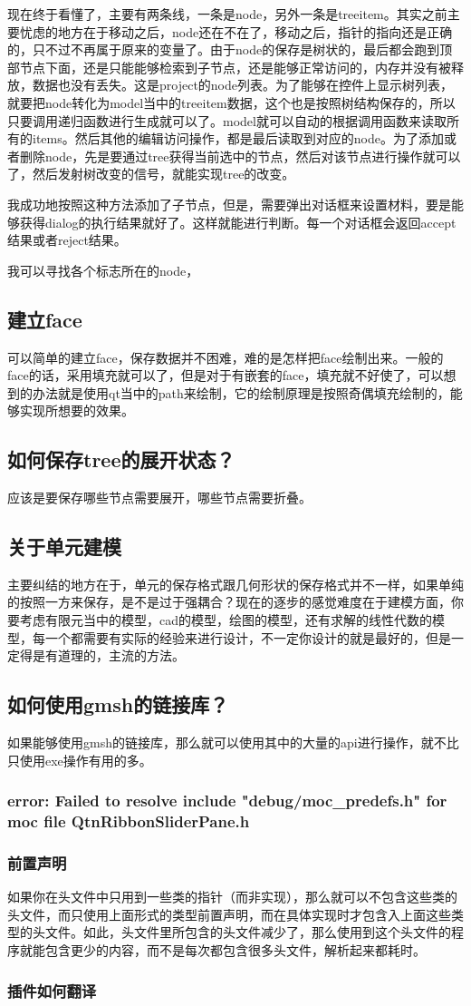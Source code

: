 现在终于看懂了，主要有两条线，一条是node，另外一条是treeitem。其实之前主要忧虑的地方在于移动之后，node还在不在了，移动之后，指针的指向还是正确的，只不过不再属于原来的变量了。由于node的保存是树状的，最后都会跑到顶部节点下面，还是只能能够检索到子节点，还是能够正常访问的，内存并没有被释放，数据也没有丢失。这是project的node列表。为了能够在控件上显示树列表，就要把node转化为model当中的treeitem数据，这个也是按照树结构保存的，所以只要调用递归函数进行生成就可以了。model就可以自动的根据调用函数来读取所有的items。然后其他的编辑访问操作，都是最后读取到对应的node。为了添加或者删除node，先是要通过tree获得当前选中的节点，然后对该节点进行操作就可以了，然后发射树改变的信号，就能实现tree的改变。

我成功地按照这种方法添加了子节点，但是，需要弹出对话框来设置材料，要是能够获得dialog的执行结果就好了。这样就能进行判断。每一个对话框会返回accept结果或者reject结果。

我可以寻找各个标志所在的node，
\subsection{建立face}
可以简单的建立face，保存数据并不困难，难的是怎样把face绘制出来。一般的face的话，采用填充就可以了，但是对于有嵌套的face，填充就不好使了，可以想到的办法就是使用qt当中的path来绘制，它的绘制原理是按照奇偶填充绘制的，能够实现所想要的效果。
\subsection{如何保存tree的展开状态？}
应该是要保存哪些节点需要展开，哪些节点需要折叠。
\subsection{关于单元建模}
主要纠结的地方在于，单元的保存格式跟几何形状的保存格式并不一样，如果单纯的按照一方来保存，是不是过于强耦合？现在的逐步的感觉难度在于建模方面，你要考虑有限元当中的模型，cad的模型，绘图的模型，还有求解的线性代数的模型，每一个都需要有实际的经验来进行设计，不一定你设计的就是最好的，但是一定得是有道理的，主流的方法。
\subsection{如何使用gmsh的链接库？}
如果能够使用gmsh的链接库，那么就可以使用其中的大量的api进行操作，就不比只使用exe操作有用的多。
\subsubsection{error: Failed to resolve include "debug/moc\_predefs.h" for moc file QtnRibbonSliderPane.h}
\subsubsection{前置声明}
如果你在头文件中只用到一些类的指针（而非实现），那么就可以不包含这些类的头文件，而只使用上面形式的类型前置声明，而在具体实现时才包含入上面这些类型的头文件。如此，头文件里所包含的头文件减少了，那么使用到这个头文件的程序就能包含更少的内容，而不是每次都包含很多头文件，解析起来都耗时。
\subsubsection{插件如何翻译}
